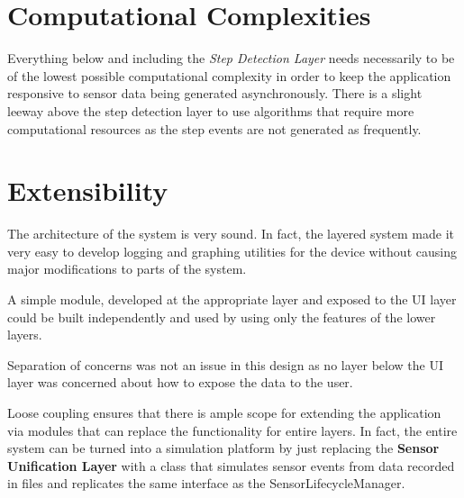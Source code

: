 \section{Computational Complexities}

Everything below and including the \emph{Step Detection Layer} needs necessarily to be of the 
lowest possible computational complexity in order to keep the application 
responsive to sensor data being generated asynchronously. There is 
a slight leeway above the step detection layer to use algorithms that 
require more computational resources as the step events are not 
generated as frequently.

\section{Extensibility}

The architecture of the system is very sound. In fact, the layered system 
made it very easy to develop logging and graphing utilities for the 
device without causing major modifications to parts of the system. 

A simple module, developed at the appropriate layer and 
exposed to the UI layer could be built independently and used by using only 
the features of the lower layers.

Separation of concerns was not an issue in this  
design as no layer below the UI layer was concerned about how to expose the data 
to the user. 

Loose coupling ensures that there is ample scope for extending the application via 
modules that can replace the functionality for entire layers. In fact, 
the entire system can be turned into a simulation platform by just 
replacing the \textbf{Sensor Unification Layer} with a class that 
simulates sensor events from data recorded in files and replicates the same 
interface as the SensorLifecycleManager.


